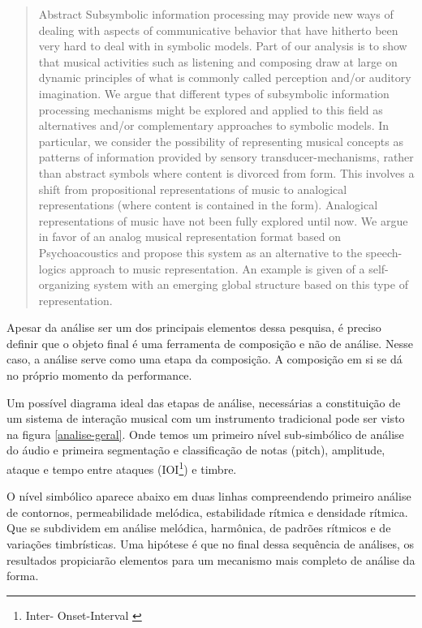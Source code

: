 \documentclass{ppgmus}
\begin{document}
\begin{quotation}
 Abstract Subsymbolic information processing may provide new ways of dealing with aspects of 
communicative behavior that have hitherto been very hard to deal with in symbolic models. 
Part of our analysis is to show that musical activities such as listening and composing draw at 
large on dynamic principles of what is commonly called perception and/or auditory imagination. 
We argue that different types of subsymbolic information processing mechanisms might be explored 
and applied to this field as alternatives and/or complementary approaches to symbolic models. 
In particular, we consider the possibility of representing musical concepts as patterns of 
information provided by sensory transducer-mechanisms, rather than abstract symbols where content 
is divorced from form. This involves a shift from propositional representations of music to analogical 
representations (where content is contained in the form). Analogical representations of music 
have not been fully explored until now. We argue in favor of an analog musical representation 
format based on Psychoacoustics and propose this system as an alternative to the speech-logics 
approach to music representation. An example is given of a self-organizing system with an emerging 
global structure based on this type of representation.
\end{quotation}



Apesar da análise ser um dos principais elementos dessa pesquisa, é preciso
definir que o objeto final é uma ferramenta de composição e não de análise.
Nesse caso, a análise serve como uma etapa da composição. A composição em si
se dá no próprio momento da performance. 

Um possível diagrama ideal das etapas de análise, necessárias a
constituição de um sistema de interação musical com um instrumento
tradicional pode ser visto na figura \ref{analise-geral}. Onde temos um
primeiro nível sub-simbólico de análise do áudio e primeira segmentação
e classificação de notas (pitch), amplitude, ataque e tempo entre ataques (IOI\footnote{Inter-
Onset-Interval \cite{rowe2004machine}}) e timbre.

O nível simbólico aparece abaixo em duas linhas compreendendo primeiro análise de 
contornos, permeabilidade melódica, estabilidade rítmica e densidade rítmica. 
Que se subdividem em análise melódica, harmônica, de padrões rítmicos e de 
variações timbrísticas. Uma hipótese é que no final dessa sequência de análises,
os resultados propiciarão elementos para um mecanismo mais completo de análise da
forma.
\end{document}
